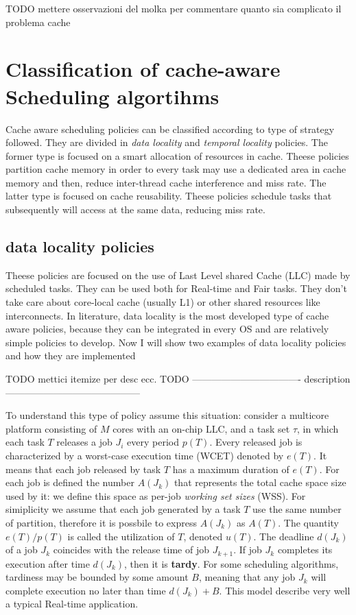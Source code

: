 TODO  mettere osservazioni del molka per commentare quanto sia complicato il problema cache

\section{Classification of cache-aware Scheduling algortihms}

Cache aware scheduling policies can be classified according to type of strategy followed. They are divided in \textit{data locality} and 
\textit{temporal locality} policies. The former type is focused on a smart allocation of resources in cache. Theese policies partition cache memory in order
to every task may use a dedicated area in cache memory and then, reduce inter-thread cache interference and miss rate.
The latter type is focused on cache reusability. Theese policies schedule tasks that subsequently will access at the same data, reducing miss rate.

\subsection{data locality policies} 

Theese policies are focused on the use of Last Level shared Cache (LLC) made by scheduled tasks. They can be used both for 
Real-time and Fair tasks. They don't take care about core-local cache (usually L1) or other shared resources like interconnects. 
In literature, data locality is the most developed type of cache aware policies, because they can be integrated in every OS and are relatively simple 
policies to develop. Now I will show two examples of data locality policies and how they are implemented

TODO mettici itemize per desc ecc.
TODO ---------------------------------- description ------------------------------------------

To understand this type of policy assume this situation: consider a multicore platform consisting of $M$ cores with an on-chip LLC, and a task set $\tau$, 
in which each task $T$ releases a job $J_i$ every period $p(T)$. Every released job is characterized by a worst-case execution time (WCET) denoted by 
$e(T)$. It means that each job released by task $T$ has a maximum duration of $e(T)$. For each job is defined the number $A(J_k)$ that represents 
the total cache space size used by it: we define this space as per-job \textit{working set sizes} (WSS). For simiplicity we assume that each job generated 
by a task $T$ use the same number of partition, therefore it is possbile to express $A(J_k)$ as $A(T)$. The quantity $e(T)/p(T)$ is called the utilization 
of $T$, denoted $u(T)$. The deadline $d(J_k)$ of a job $J_k$ coincides with the release time of job $J_{k+1}$. If job $J_k$ completes its execution after 
time $d(J_k)$, then it is \textbf{tardy}. For some scheduling algorithms, tardiness may be bounded by some amount $B$, meaning that any job $J_k$ will 
complete execution no later than time $d(J_k)+B$. This model describe very well a typical Real-time application.

